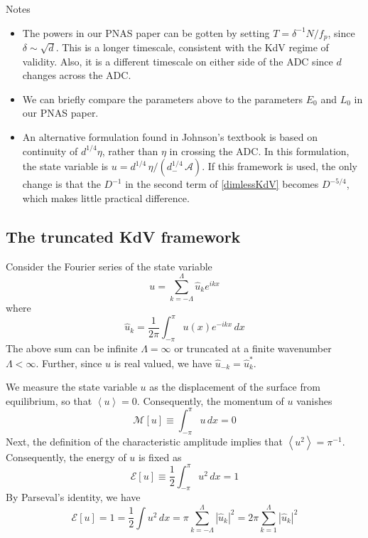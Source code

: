 \documentclass[11pt]{article}
\newcommand{\vsp}[1]{\vspace{#1 pc} \noindent}
\newcommand{\abs}[1]{\left| #1 \right|}
\newcommand{\mean}[1]{\left< #1 \right>}
\newcommand{\dx}{\, dx}
\newcommand{\freqp}{f_p}
\newcommand{\depth}{d}
\newcommand{\dup}{\depth_{-}}
\newcommand{\lamfac}{N}
\newcommand{\En}{\mathcal{E}}
\newcommand{\Mo}{\mathcal{M}}
\newcommand{\ampscale}{\mathcal{A}}
\newcommand{\uhat}{\hat{u}}
\begin{document}
 
\vsp{2}
Notes
\begin{itemize}
\item The powers in our PNAS paper can be gotten by setting $T = \delta^{-1} \lamfac / \freqp$, since $\delta \sim \sqrt{\depth}$. This is a longer timescale, consistent with the KdV regime of validity. Also, it is a different timescale on either side of the ADC since $\depth$ changes across the ADC.
\item We can briefly compare the parameters above to the parameters $E_0$ and $L_0$ in our PNAS paper.
\item An alternative formulation found in Johnson's textbook is based on continuity of $\depth^{1/4} \eta$, rather than $\eta$ in crossing the ADC. In this formulation, the state variable is $u = \depth^{1/4} \, \eta / (\dup^{1/4} \, \ampscale)$. If this framework is used, the only change is that the $D^{-1}$ in the second term of \eqref{dimlessKdV} becomes $D^{-5/4}$, which makes little practical difference.
\end{itemize}


\subsection{The truncated KdV framework}
\label{tKdVSec}

Consider the Fourier series of the state variable
\begin{equation}
u = \sum_{k=-\Lambda}^{\Lambda} \uhat_k e^{i k x}
\end{equation}
where
\begin{equation}
\uhat_k = \frac{1}{2 \pi} \int_{-\pi}^{\pi} u(x) e^{-i k x} \dx
\end{equation}
The above sum can be infinite $\Lambda = \infty$ or truncated at a finite wavenumber $\Lambda < \infty$. Further, since $u$ is real valued, we have $\uhat_{-k} = \uhat_{k}^*$.


We measure the state variable $u$ as the displacement of the surface from equilibrium, so that $\mean{u} = 0$. Consequently, the momentum of $u$ vanishes
\begin{equation}
\Mo[u] \equiv \int_{-\pi}^{\pi} u \dx = 0
\end{equation}
Next, the definition of the characteristic amplitude implies that $\mean{u^2} = \pi^{-1}$. Consequently, the energy of $u$ is fixed as
\begin{equation}
\En[u] \equiv \frac{1}{2} \int_{-\pi}^{\pi} u^2 \dx = 1
\end{equation}
By Parseval's identity, we have
\begin{equation}
\En[u] = 1 = \frac{1}{2} \int u^2 \dx = \pi \sum_{k=-\Lambda}^{\Lambda} \abs{\uhat_k}^2 = 2 \pi \sum_{k=1}^{\Lambda} \abs{\uhat_k}^2
\end{equation}
\end{document}
